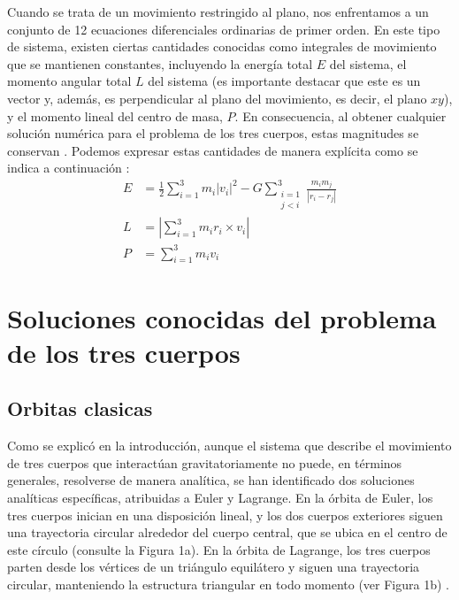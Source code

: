\documentclass{article}
\begin{document}
Cuando se trata de un movimiento restringido al plano, 
nos enfrentamos a un conjunto de 12 ecuaciones 
diferenciales ordinarias de primer orden. 
En este tipo de sistema, existen ciertas 
cantidades conocidas como integrales de movimiento 
que se mantienen constantes, incluyendo la 
energía total $E$ del sistema, el momento 
angular total $L$ del sistema (es importante 
destacar que este es un vector y, además, es 
perpendicular al plano del movimiento, es decir, el plano $xy$), 
y el momento lineal del centro de masa, $P$. 
En consecuencia, al obtener cualquier solución 
numérica para el problema de los tres cuerpos, 
estas magnitudes se conservan \cite{musielak2014three}. Podemos expresar estas 
cantidades de manera explícita como se indica a continuación : \\

\begin{align}
    E &= \frac{1}{2} \sum_{i=1}^3 m_i {|v_i|}^2 - G\sum_{\substack{i=1 \\ j < i}}^3 \frac{m_im_j}{|r_i - r_j|} \\
    L &= \left| \sum_{i = 1}^3 m_ir_i \times v_i \right| \\
    P &= \sum_{i=1}^3m_iv_i
\end{align}


\section{ Soluciones conocidas del problema de los tres cuerpos}

\subsection{Orbitas clasicas}
Como se explicó en la introducción, aunque el sistema que 
describe el movimiento de tres cuerpos que interactúan 
gravitatoriamente no puede, en términos generales, 
resolverse de manera analítica, se han identificado 
dos soluciones analíticas específicas, atribuidas a 
Euler y Lagrange. En la órbita de Euler, los tres 
cuerpos inician en una disposición lineal, y los 
dos cuerpos exteriores siguen una trayectoria 
circular alrededor del cuerpo central, que se ubica 
en el centro de este círculo (consulte la Figura 1a). 
En la órbita de Lagrange, los tres cuerpos parten 
desde los vértices de un triángulo equilátero y 
siguen una trayectoria circular, manteniendo la 
estructura triangular en todo momento (ver Figura 1b) 
\cite{montgomery2001new}.
\end{document}
